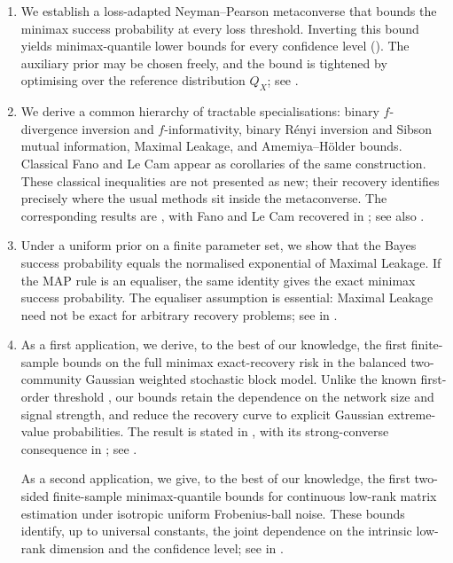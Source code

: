 \documentclass[11pt]{article}
\theoremstyle{definition}
\theoremstyle{remark}
\newcommand{\1}{\boldsymbol{1}}
\begin{document}
\begin{enumerate}
\item We establish a loss-adapted Neyman--Pearson metaconverse that bounds the
minimax success probability at every loss threshold. Inverting this bound
yields minimax-quantile lower bounds for every confidence level
(). The auxiliary prior may be chosen freely, and
the bound is tightened by optimising over the reference distribution
\(Q_X\); see .

\item We derive a common hierarchy of tractable specialisations:
binary \(f\)-divergence inversion and \(f\)-informativity, binary
R\'enyi inversion and Sibson mutual information, Maximal Leakage, and
Amemiya--H\"older bounds. Classical Fano and Le Cam appear as corollaries
of the same construction. These classical inequalities are not presented
as new; their recovery identifies precisely where the usual methods sit
inside the metaconverse. The corresponding results are
,
with Fano and Le Cam recovered in
; see also
.

\item Under a uniform prior on a finite parameter set, we show that the
Bayes success probability equals the normalised exponential of Maximal
Leakage. If the MAP rule is an equaliser, the same identity gives the
exact minimax success probability. The equaliser assumption is essential:
Maximal Leakage need not be exact for arbitrary recovery problems; see
 in
.

\item As a first application, we derive, to the best of our knowledge,
the first finite-sample bounds on the full minimax exact-recovery risk in
the balanced two-community Gaussian weighted stochastic block model.
Unlike the known first-order threshold \cite{PandeyKulkarni2024}, our
bounds retain the dependence on the network size and signal strength, and
reduce the recovery curve to explicit Gaussian extreme-value
probabilities.
The result is stated in , with its
strong-converse consequence in ; see
.

As a second application, we give, to the best of our knowledge, the first
two-sided finite-sample minimax-quantile bounds for continuous low-rank
matrix estimation under isotropic uniform Frobenius-ball noise. These
bounds identify, up to universal constants, the joint dependence on the
intrinsic low-rank dimension and the confidence level; see
 in
.


\end{enumerate}
\end{document}
